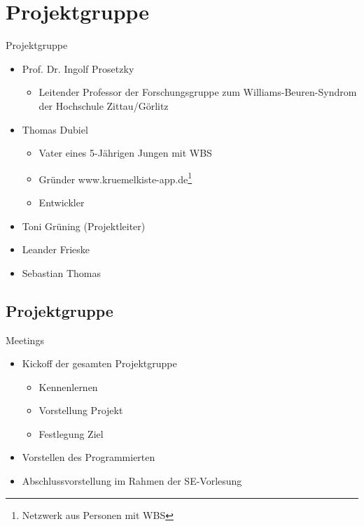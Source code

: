 \documentclass[10pt,fleqn]{beamer}
\begin{document}
\section{Projektgruppe}
	\begin{frame}[t]{Projektgruppe}
		\begin{itemize}
			\item Prof. Dr. Ingolf Prosetzky
			\begin{itemize}
				\item Leitender Professor der Forschungsgruppe zum Williams-Beuren-Syndrom der Hochschule Zittau/Görlitz
			\end{itemize}
			\item Thomas Dubiel
			\begin{itemize}
				\item Vater eines 5-Jährigen Jungen mit WBS
				\item Gründer www.kruemelkiste-app.de\footnote{Netzwerk aus Personen mit WBS}
				\item Entwickler
			\end{itemize}
			\item Toni Grüning (Projektleiter)
			\item Leander Frieske
			\item Sebastian Thomas
		\end{itemize}
	\end{frame}

\subsection{Projektgruppe}
\begin{frame}[t]{Meetings}
\begin{itemize}
	\item Kickoff der gesamten Projektgruppe
	\begin{itemize}
		\item Kennenlernen
		\item Vorstellung Projekt
		\item Festlegung Ziel
	\end{itemize}
	\item Vorstellen des Programmierten
	\item Abschlussvorstellung im Rahmen der SE-Vorlesung 
\end{itemize}
\end{frame}
\end{document}
